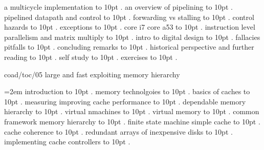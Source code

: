  a multicycle implementation \leaders\hbox to 10pt {\hss.\hss}  \hfill {}
 an overview of pipelining \leaders\hbox to 10pt {\hss.\hss}  \hfill {}
 pipelined datapath and control \leaders\hbox to 10pt {\hss.\hss}  \hfill {}
 forwarding vs stalling \leaders\hbox to 10pt {\hss.\hss}  \hfill {}
 control hazards \leaders\hbox to 10pt {\hss.\hss}  \hfill {}
 exceptions \leaders\hbox to 10pt {\hss.\hss}  \hfill {}
 core i7 core a53 \leaders\hbox to 10pt {\hss.\hss}  \hfill {}
 instruction level parallelism and matrix multiply \leaders\hbox to 10pt {\hss.\hss}  \hfill {}
 intro to digital design \leaders\hbox to 10pt {\hss.\hss}  \hfill {}
 fallacies pitfalls \leaders\hbox to 10pt {\hss.\hss}  \hfill {}
 concluding remarks \leaders\hbox to 10pt {\hss.\hss}  \hfill {}
 historical perspective and further reading \leaders\hbox to 10pt {\hss.\hss}  \hfill {}
 self study \leaders\hbox to 10pt {\hss.\hss}  \hfill {}
 exercises \leaders\hbox to 10pt {\hss.\hss}  \hfill {}
\smallskip
\par\endgroup
\bigskip
{}
coad/toc/05 large and fast exploiting memory hierarchy
\par\begingroup
\leftskip=2em
\smallskip
{} introduction \leaders\hbox to 10pt {\hss.\hss}  \hfill {}
 memory technolgoies \leaders\hbox to 10pt {\hss.\hss}  \hfill {}
 basics of caches \leaders\hbox to 10pt {\hss.\hss}  \hfill {}
 measuring improving cache performance \leaders\hbox to 10pt {\hss.\hss}  \hfill {}
 dependable memory hierarchy \leaders\hbox to 10pt {\hss.\hss}  \hfill {}
 virtual nmachines \leaders\hbox to 10pt {\hss.\hss}  \hfill {}
 virtual memory \leaders\hbox to 10pt {\hss.\hss}  \hfill {}
 common framework memory hierarchy \leaders\hbox to 10pt {\hss.\hss}  \hfill {}
 finite state machine simple cache \leaders\hbox to 10pt {\hss.\hss}  \hfill {}
 cache coherence \leaders\hbox to 10pt {\hss.\hss}  \hfill {}
 redundant arrays of inexpensive disks \leaders\hbox to 10pt {\hss.\hss}  \hfill {}
 implementing cache controllers \leaders\hbox to 10pt {\hss.\hss}  \hfill {}
